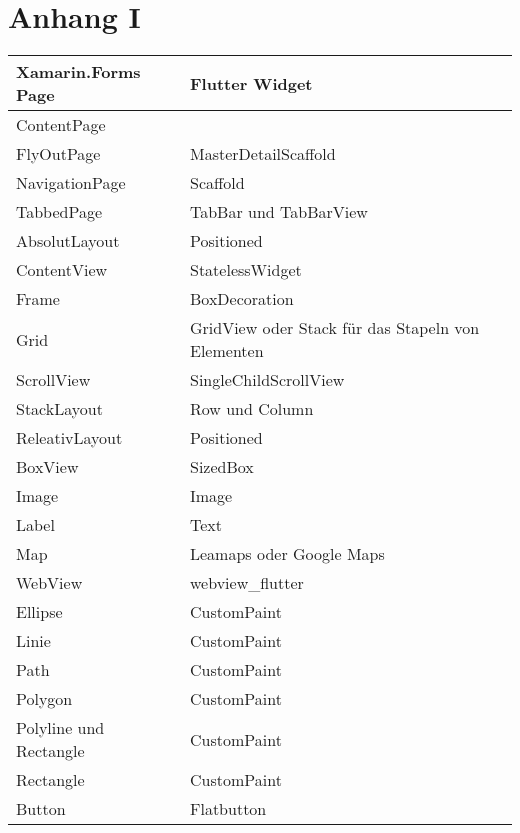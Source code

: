 \backmatter      %
\setcounter{page}{8}

\chapter{Anhang I }
\label{chap:Gegenueberstellung}

\begin{table}
\begin{tabularx}{\textwidth}{X|X}
   \textbf{Xamarin.Forms Page} & \textbf{Flutter Widget}  \\  
\hline
	ContentPage            			&           	\\ 
	FlyOutPage             			& MasterDetailScaffold          	\\ 
	NavigationPage       			& Scaffold         	 					\\ 
	TabbedPage            			& TabBar und TabBarView 		\\ 
	AbsolutLayout       				&  Positioned	 			\\ 
	ContentView       				&  StatelessWidget	 			\\ 
	Frame       							&  BoxDecoration     	 			\\ 
	Grid            						&  GridView oder Stack für das Stapeln von Elementen						\\ 
	ScrollView            				&  SingleChildScrollView		\\ 
	StackLayout       				&  Row und Column  	 			\\ 
	ReleativLayout           		&  Positioned		\\ 
	BoxView		       				&   	 SizedBox  		\\ 
	Image       							&	     Image	 			\\ 
	Label       							&  	Text 					\\ 
	Map            						&	   	Leamaps oder Google Maps \\ 
	WebView            				&  	webview\_flutter	\\ 
	Ellipse								&  	CustomPaint	\\ 
	Linie									&	  	CustomPaint	\\ 
	Path  								&  	CustomPaint	\\ 
	Polygon  							&  	CustomPaint	\\ 
	Polyline und Rectangle  	&  	CustomPaint	\\ 
	Rectangle  						&  	CustomPaint	\\ 
	Button		       					&  	Flatbutton 		\\ 

\end{tabularx}
\end{table}
